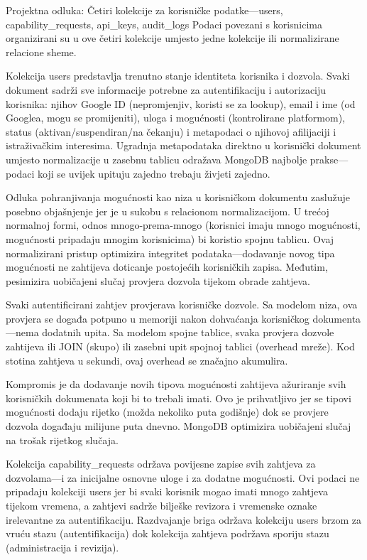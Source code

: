 \documentclass[12pt,a4paper]{article}
\begin{document}
\begin{rationale}{Projektna odluka: Četiri kolekcije za korisničke podatke—users, capability\_requests, api\_keys, audit\_logs}
Podaci povezani s korisnicima organizirani su u ove četiri kolekcije umjesto jedne kolekcije ili normalizirane relacione sheme.
\end{rationale}

Kolekcija users predstavlja trenutno stanje identiteta korisnika i dozvola. Svaki dokument sadrži sve informacije potrebne za autentifikaciju i autorizaciju korisnika: njihov Google ID (nepromjenjiv, koristi se za lookup), email i ime (od Googlea, mogu se promijeniti), uloga i mogućnosti (kontrolirane platformom), status (aktivan/suspendiran/na čekanju) i metapodaci o njihovoj afilijaciji i istraživačkim interesima. Ugradnja metapodataka direktno u korisnički dokument umjesto normalizacije u zasebnu tablicu odražava MongoDB najbolje prakse—podaci koji se uvijek upituju zajedno trebaju živjeti zajedno.

Odluka pohranjivanja mogućnosti kao niza u korisničkom dokumentu zaslužuje posebno objašnjenje jer je u sukobu s relacionom normalizacijom. U trećoj normalnoj formi, odnos mnogo-prema-mnogo (korisnici imaju mnogo mogućnosti, mogućnosti pripadaju mnogim korisnicima) bi koristio spojnu tablicu. Ovaj normalizirani pristup optimizira integritet podataka—dodavanje novog tipa mogućnosti ne zahtijeva doticanje postojećih korisničkih zapisa. Međutim, pesimizira uobičajeni slučaj provjera dozvola tijekom obrade zahtjeva.

Svaki autentificirani zahtjev provjerava korisničke dozvole. Sa modelom niza, ova provjera se događa potpuno u memoriji nakon dohvaćanja korisničkog dokumenta—nema dodatnih upita. Sa modelom spojne tablice, svaka provjera dozvole zahtijeva ili JOIN (skupo) ili zasebni upit spojnoj tablici (overhead mreže). Kod stotina zahtjeva u sekundi, ovaj overhead se značajno akumulira.

Kompromis je da dodavanje novih tipova mogućnosti zahtijeva ažuriranje svih korisničkih dokumenata koji bi to trebali imati. Ovo je prihvatljivo jer se tipovi mogućnosti dodaju rijetko (možda nekoliko puta godišnje) dok se provjere dozvola događaju milijune puta dnevno. MongoDB optimizira uobičajeni slučaj na trošak rijetkog slučaja.

Kolekcija capability\_requests održava povijesne zapise svih zahtjeva za dozvolama—i za inicijalne osnovne uloge i za dodatne mogućnosti. Ovi podaci ne pripadaju kolekciji users jer bi svaki korisnik mogao imati mnogo zahtjeva tijekom vremena, a zahtjevi sadrže bilješke revizora i vremenske oznake irelevantne za autentifikaciju. Razdvajanje briga održava kolekciju users brzom za vruću stazu (autentifikacija) dok kolekcija zahtjeva podržava sporiju stazu (administracija i revizija).
\end{document}
